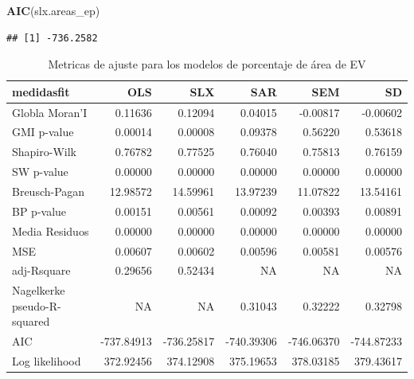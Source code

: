 \documentclass[12pt,]{book}
\newenvironment{Shaded}{\begin{snugshade}}{\end{snugshade}}
\newcommand{\KeywordTok}[1]{\textcolor[rgb]{0.13,0.29,0.53}{\textbf{#1}}}
\newcommand{\NormalTok}[1]{#1}
\begin{document}
\begin{Shaded}
\begin{Highlighting}[]
\KeywordTok{AIC}\NormalTok{(slx.areas_ep)}
\end{Highlighting}
\end{Shaded}

\begin{verbatim}
## [1] -736.2582
\end{verbatim}

\begin{table}

\caption{\label{tab:tabla-comp-modelos-areaep}Metricas de ajuste para los modelos de porcentaje de área de EV}
\centering
\begin{tabular}[t]{l|r|r|r|r|r}
\hline
medidasfit & OLS & SLX & SAR & SEM & SD\\
\hline
Globla Moran'I & 0.11636 & 0.12094 & 0.04015 & -0.00817 & -0.00602\\
\hline
GMI p-value & 0.00014 & 0.00008 & 0.09378 & 0.56220 & 0.53618\\
\hline
Shapiro-Wilk & 0.76782 & 0.77525 & 0.76040 & 0.75813 & 0.76159\\
\hline
SW p-value & 0.00000 & 0.00000 & 0.00000 & 0.00000 & 0.00000\\
\hline
Breusch-Pagan & 12.98572 & 14.59961 & 13.97239 & 11.07822 & 13.54161\\
\hline
BP p-value & 0.00151 & 0.00561 & 0.00092 & 0.00393 & 0.00891\\
\hline
Media Residuos & 0.00000 & 0.00000 & 0.00000 & 0.00000 & 0.00000\\
\hline
MSE & 0.00607 & 0.00602 & 0.00596 & 0.00581 & 0.00576\\
\hline
adj-Rsquare & 0.29656 & 0.52434 & NA & NA & NA\\
\hline
Nagelkerke pseudo-R-squared & NA & NA & 0.31043 & 0.32222 & 0.32798\\
\hline
AIC & -737.84913 & -736.25817 & -740.39306 & -746.06370 & -744.87233\\
\hline
Log likelihood & 372.92456 & 374.12908 & 375.19653 & 378.03185 & 379.43617\\
\hline
\end{tabular}
\end{table}
\end{document}
